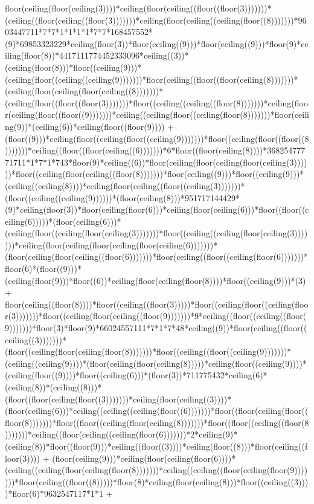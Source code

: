 floor(ceiling(floor(ceiling(3))))*ceiling(floor(ceiling((floor((floor(3)))))))*(ceiling((floor(ceiling((floor(3)))))))*ceiling(floor(ceiling((ceiling(floor((8)))))))*9603447711*7*7*1*1*1*1*7*7*168457552*(9)*69853323229*ceiling(floor(3))*floor(ceiling((9)))*floor(ceiling((9)))*floor(9)*ceiling(floor(8))*4417111774452333096*ceiling((3))*(ceiling(floor(8)))*floor((ceiling(9)))*(ceiling(floor((ceiling((ceiling(9)))))))*floor(ceiling((floor((floor(ceiling(8)))))))*(ceiling(floor(ceiling(floor(ceiling((8)))))))*(ceiling(floor((floor((floor(3)))))))*floor((ceiling((ceiling((floor(8)))))))*ceiling(floor(ceiling(floor((floor((9)))))))*ceiling((ceiling(floor((ceiling(floor(8)))))))*floor(ceiling(9))*(ceiling(6))*ceiling(floor((floor(9)))) + (floor((9)))*ceiling(floor((ceiling(floor((ceiling(9)))))))*floor((ceiling(floor((floor((8)))))))*ceiling((floor((floor(ceiling((6)))))))*6*floor((floor(ceiling(8))))*36825477771711*1*7*1*743*floor(9)*ceiling((6))*floor(ceiling(floor(ceiling(floor(ceiling(3))))))*floor((ceiling(floor(ceiling((floor(8)))))))*floor(ceiling((9)))*floor((ceiling(9)))*(ceiling((ceiling(8))))*ceiling(floor(ceiling((floor((ceiling(3)))))))*(floor((ceiling((ceiling(9))))))*(floor(ceiling(8)))*951717144429*(9)*ceiling(floor(3))*floor(ceiling(floor(6)))*ceiling(floor(ceiling(6)))*floor((floor((ceiling(6)))))*(floor(ceiling(6)))*(ceiling(floor((ceiling(floor(ceiling(3)))))))*floor((ceiling((ceiling(floor(ceiling(3)))))))*ceiling(floor(ceiling(floor(ceiling(floor(ceiling(6)))))))*(floor(ceiling(floor(ceiling((floor(6)))))))*floor(ceiling((floor((ceiling(floor(6)))))))*floor(6)*(floor((9)))*(ceiling(floor(9)))*floor((6))*ceiling(floor(ceiling(floor(8))))*floor((ceiling(9)))*(3) + floor(ceiling((floor(8))))*floor((ceiling((floor(3)))))*floor((ceiling(floor((ceiling(floor(3)))))))*floor((ceiling(floor(ceiling((floor(9)))))))*9*ceiling((floor((ceiling((floor(9)))))))*floor(3)*floor(9)*66024557111*7*1*7*48*ceiling((9))*floor(ceiling((floor((ceiling((3)))))))*(floor((ceiling(floor(ceiling(floor(8)))))))*floor((ceiling((floor((ceiling(9)))))))*(ceiling((ceiling(9))))*(floor(ceiling(floor(ceiling(8)))))*ceiling(floor((ceiling(9))))*(ceiling(floor((9))))*floor((ceiling(6)))*(floor(3))*711775432*ceiling(6)*(ceiling(8))*(ceiling((8)))*(floor((floor(ceiling(floor((3)))))))*ceiling(floor(ceiling((3))))*(floor(ceiling(6)))*ceiling((ceiling((ceiling(floor((6)))))))*floor((floor(ceiling(floor((floor(8)))))))*floor((floor((ceiling(floor(ceiling(8)))))))*floor((floor((ceiling((floor(8)))))))*ceiling((floor(ceiling((ceiling(floor(6)))))))*2*ceiling(9)*(ceiling(8))*floor((floor(9)))*ceiling((floor((3))))*ceiling(floor((8)))*floor(ceiling((floor(3)))) + (floor(ceiling(9)))*ceiling(floor(ceiling(floor(6))))*(ceiling((ceiling(floor(ceiling(floor(8)))))))*ceiling((ceiling((floor(ceiling(floor(9)))))))*floor(ceiling((floor((8)))))*floor(8)*ceiling(floor(ceiling(8)))*floor((ceiling((3))))*floor(6)*9632547117*1*1 + 